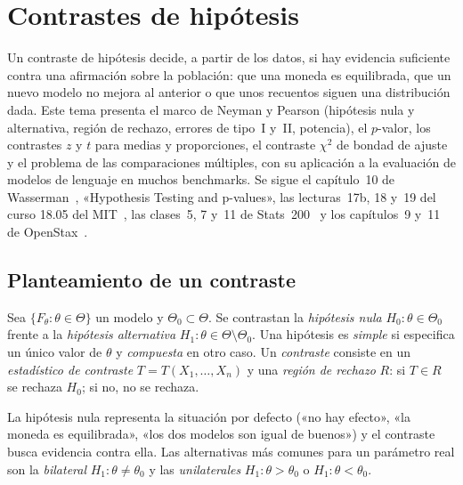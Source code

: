 \chapter{Contrastes de hipótesis}
\label{tema:5}

Un contraste de hipótesis decide, a partir de los datos, si hay evidencia suficiente contra una afirmación sobre la población: que una moneda es equilibrada, que un nuevo modelo no mejora al anterior o que unos recuentos siguen una distribución dada. Este tema presenta el marco de Neyman y Pearson (hipótesis nula y alternativa, región de rechazo, errores de tipo~I y~II, potencia), el $p$-valor, los contrastes $z$ y $t$ para medias y proporciones, el contraste $\chi^{2}$ de bondad de ajuste y el problema de las comparaciones múltiples, con su aplicación a la evaluación de modelos de lenguaje en muchos benchmarks. Se sigue el capítulo~10 de Wasserman~\cite{wasserman}, «Hypothesis Testing and p-values», las lecturas~17b, 18 y~19 del curso 18.05 del MIT~\cite{mit1805}, las clases~5, 7 y~11 de Stats~200~\cite{stats200} y los capítulos~9 y~11 de OpenStax~\cite{openstax}.

\section{Planteamiento de un contraste}

\begin{definicion}\label{def:t5-contraste}
Sea $\{F_\theta:\theta\in\Theta\}$ un modelo y $\Theta_0\subset\Theta$. Se contrastan la \emph{hipótesis nula} $H_0:\theta\in\Theta_0$ frente a la \emph{hipótesis alternativa} $H_1:\theta\in\Theta\setminus\Theta_0$. Una hipótesis es \emph{simple} si especifica un único valor de $\theta$ y \emph{compuesta} en otro caso. Un \emph{contraste} consiste en un \emph{estadístico de contraste} $T=T(X_1,\dots,X_n)$ y una \emph{región de rechazo} $R$: si $T\in R$ se rechaza $H_0$; si no, no se rechaza.
\end{definicion}

La hipótesis nula representa la situación por defecto («no hay efecto», «la moneda es equilibrada», «los dos modelos son igual de buenos») y el contraste busca evidencia contra ella. Las alternativas más comunes para un parámetro real son la \emph{bilateral} $H_1:\theta\neq\theta_0$ y las \emph{unilaterales} $H_1:\theta>\theta_0$ o $H_1:\theta<\theta_0$.

